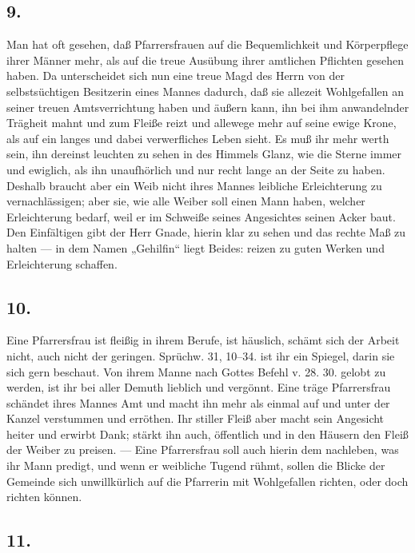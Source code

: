 \subsection{9.}

Man hat oft gesehen, daß Pfarrersfrauen auf die Bequemlichkeit und Körperpflege ihrer Männer mehr, als auf die treue Ausübung ihrer amtlichen Pflichten gesehen haben. Da unterscheidet sich nun eine treue Magd des Herrn von der selbstsüchtigen Besitzerin eines Mannes dadurch, daß sie allezeit Wohlgefallen an seiner treuen Amtsverrichtung haben und äußern kann, ihn bei ihm anwandelnder Trägheit mahnt und zum Fleiße reizt und allewege mehr auf seine ewige Krone, als auf ein langes und dabei verwerfliches Leben sieht. Es muß ihr mehr werth sein, ihn dereinst leuchten zu sehen in des Himmels Glanz, wie die Sterne immer und ewiglich, als ihn unaufhörlich und nur recht lange an der Seite zu haben. Deshalb braucht aber ein Weib nicht ihres Mannes leibliche Erleichterung zu vernachlässigen; aber sie, wie alle Weiber soll einen Mann haben, welcher Erleichterung bedarf, weil er im Schweiße seines Angesichtes seinen Acker baut. Den Einfältigen gibt der Herr Gnade, hierin klar zu sehen und das rechte Maß zu halten — in dem Namen „Gehilfin“ liegt Beides: reizen zu guten Werken und Erleichterung schaffen.

\subsection{10.}

Eine Pfarrersfrau ist fleißig in ihrem Berufe, ist häuslich, schämt sich der Arbeit nicht, auch nicht der geringen. Sprüchw. 31, 10–34. ist ihr ein Spiegel, darin sie sich gern beschaut. Von ihrem Manne nach Gottes Befehl v. 28. 30. gelobt zu werden, ist ihr bei aller Demuth lieblich und vergönnt.
Eine träge Pfarrersfrau schändet ihres Mannes Amt und macht ihn mehr als einmal auf und unter der Kanzel verstummen und erröthen. Ihr stiller Fleiß aber macht sein Angesicht heiter und erwirbt Dank; stärkt ihn auch, öffentlich und in den Häusern den Fleiß der Weiber zu preisen. — Eine Pfarrersfrau soll auch hierin dem nachleben, was ihr Mann predigt, und wenn er weibliche Tugend rühmt, sollen die Blicke der Gemeinde sich unwillkürlich auf die Pfarrerin mit Wohlgefallen richten, oder doch richten können.

\subsection{11.}


